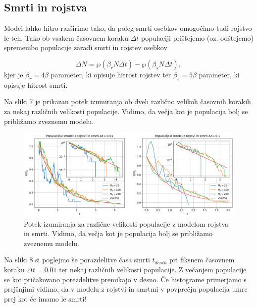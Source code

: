 \documentclass[slovene,11pt,a4paper]{article}
\begin{document}
\subsection{Smrti in rojstva}

Model lahko hitro razširimo tako, da poleg smrti osebkov omogočimo tudi rojstvo le-teh. Tako ob vsakem časovnem koraku $\Delta t$ populaciji prištejemo (oz. odštejemo) spremembo populacije zaradi smrti in rojstev osebkov

\begin{equation}
\Delta N = \wp (\beta_r N \Delta t) - \wp (\beta_s N \Delta t),
\end{equation}
kjer je $\beta_r = 4\beta$ parameter, ki opisuje hitrost rojstev ter $\beta_s = 5\beta$ parameter, ki opisuje hitrost smrti.

Na sliki 7 je prikazan potek izumiranja ob dveh različno velikoh časovnih korakih za nekaj različnih velikosti populacije. Vidimo, da večja kot je populacija bolj se približamo zveznemu modelu.

\begin{figure}[h!]
\centering
\includegraphics[width=\linewidth]{slika7.png}
\caption{Potek izumiranja za različne velikosti populacije z modelom rojstva in smrti. Vidimo, da večja kot je populacija bolj se približamo zveznemu modelu.}
\end{figure}

\newpage

Na sliki 8 si poglejmo še porazdelitve časa smrti $t_{death}$ pri fiksnem časovnem koraku $\Delta t = 0.01$ ter nekaj različnih velikosti populacije. Z večanjem populacije se kot pričakovano porezdelitve premikajo v desno. Če histograme primerjamo s prejšnjimi vidimo, da v modelu z rojstvi in smrtmi v povprečju populacija umre prej kot če imamo le smrti!
\end{document}
